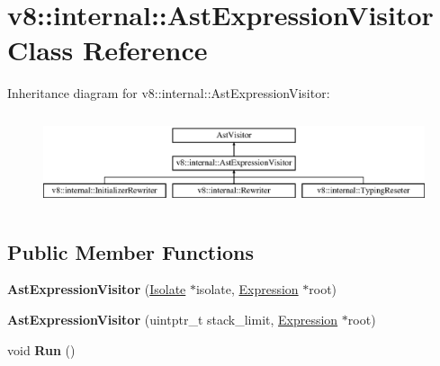 \hypertarget{classv8_1_1internal_1_1_ast_expression_visitor}{}\section{v8\+:\+:internal\+:\+:Ast\+Expression\+Visitor Class Reference}
\label{classv8_1_1internal_1_1_ast_expression_visitor}
Inheritance diagram for v8\+:\+:internal\+:\+:Ast\+Expression\+Visitor\+:\begin{figure}[H]
\begin{center}
\leavevmode
\includegraphics[height=2.745098cm]{classv8_1_1internal_1_1_ast_expression_visitor}
\end{center}
\end{figure}
\subsection*{Public Member Functions}
\begin{DoxyCompactItemize}
\item 
{\bfseries Ast\+Expression\+Visitor} (\hyperlink{classv8_1_1internal_1_1_isolate}{Isolate} $\ast$isolate, \hyperlink{classv8_1_1internal_1_1_expression}{Expression} $\ast$root)\hypertarget{classv8_1_1internal_1_1_ast_expression_visitor_a0f04d9b2eeb2585678441e10dee56ee1}{}\label{classv8_1_1internal_1_1_ast_expression_visitor_a0f04d9b2eeb2585678441e10dee56ee1}

\item 
{\bfseries Ast\+Expression\+Visitor} (uintptr\+\_\+t stack\+\_\+limit, \hyperlink{classv8_1_1internal_1_1_expression}{Expression} $\ast$root)\hypertarget{classv8_1_1internal_1_1_ast_expression_visitor_a56aedb707e53f46cf724731ebf41cc0a}{}\label{classv8_1_1internal_1_1_ast_expression_visitor_a56aedb707e53f46cf724731ebf41cc0a}

\item 
void {\bfseries Run} ()\hypertarget{classv8_1_1internal_1_1_ast_expression_visitor_a7eaeaa2d95b1cabf63e48c76883795e3}{}\label{classv8_1_1internal_1_1_ast_expression_visitor_a7eaeaa2d95b1cabf63e48c76883795e3}

\end{DoxyCompactItemize}
